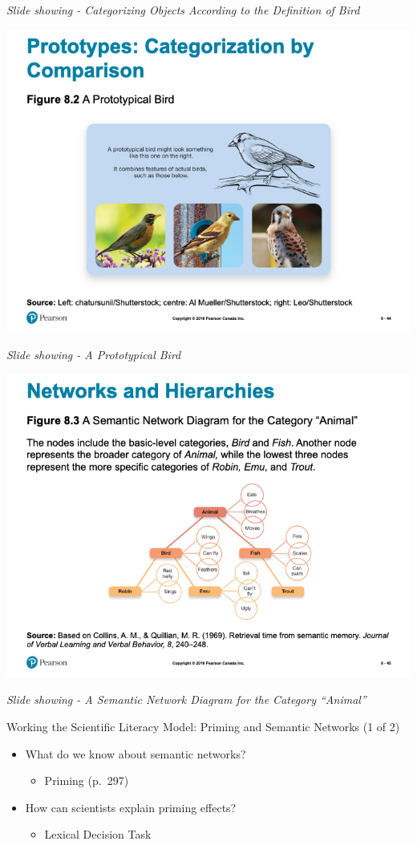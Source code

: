 \documentclass[
]{book}
\providecommand{\tightlist}{%
  \setlength{\itemsep}{0pt}\setlength{\parskip}{0pt}}
\begin{document}
\emph{Slide showing - Categorizing Objects According to the Definition of Bird}

\includegraphics{assets/unit_1/slide_44.png}

\emph{Slide showing - A Prototypical Bird}

\includegraphics{assets/unit_1/slide_45.png}

\emph{Slide showing - A Semantic Network Diagram for the Category ``Animal''}

Working the Scientific Literacy Model: Priming and Semantic
Networks (1 of 2)

\begin{itemize}
\tightlist
\item
  What do we know about semantic networks?

  \begin{itemize}
  \tightlist
  \item
    Priming (p.~297)\\
  \end{itemize}
\item
  How can scientists explain priming effects?

  \begin{itemize}
  \tightlist
  \item
    Lexical Decision Task
  \end{itemize}
\end{itemize}
\end{document}
